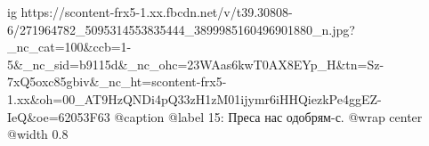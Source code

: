  
 
 
 
 

\ifcmt
  ig https://scontent-frx5-1.xx.fbcdn.net/v/t39.30808-6/271964782_5095314553835444_3899985160496901880_n.jpg?_nc_cat=100&ccb=1-5&_nc_sid=b9115d&_nc_ohc=23WAas6kwT0AX8EYp_H&tn=Sz-7xQ5oxc85gbiv&_nc_ht=scontent-frx5-1.xx&oh=00_AT9HzQNDi4pQ33zH1zM01ijymr6iHHQiezkPe4ggEZ-IeQ&oe=62053F63
  @caption @label 15: Преса нас одобрям-с.
  @wrap center
  @width 0.8
\fi
